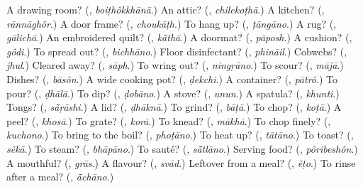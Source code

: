 \begin{tcolorbox}[breakable,colback=teal!4,colframe=teal!35!black,title={Before you move on}]
A drawing room? (\textbf{}, \emph{boiṭhôkkhānā}.) An attic? (\textbf{}, \emph{chilekoṭhā}.) A kitchen? (\textbf{}, \emph{rānnāghôr}.) A door frame? (\textbf{}, \emph{choukāṭh}.) To hang up? (\textbf{}, \emph{ṭāngāno}.) A rug? (\textbf{}, \emph{gālichā}.) An embroidered quilt? (\textbf{}, \emph{kā̃thā}.) A doormat? (\textbf{}, \emph{pāposh}.) A cushion? (\textbf{}, \emph{gôdi}.) To spread out? (\textbf{}, \emph{bichhāno}.) Floor disinfectant? (\textbf{}, \emph{phināil}.) Cobwebs? (\textbf{}, \emph{jhul}.) Cleared away? (\textbf{}, \emph{sāph}.) To wring out? (\textbf{}, \emph{ningṛāno}.) To scour? (\textbf{}, \emph{mājā}.) Dishes? (\textbf{}, \emph{bāsôn}.) A wide cooking pot? (\textbf{}, \emph{ḍekchi}.) A container? (\textbf{}, \emph{pātrô}.) To pour? (\textbf{}, \emph{ḍhālā}.) To dip? (\textbf{}, \emph{ḍobāno}.) A stove? (\textbf{}, \emph{unun}.) A spatula? (\textbf{}, \emph{khunti}.) Tongs? (\textbf{}, \emph{sā̃ṛāshi}.) A lid? (\textbf{}, \emph{ḍhāknā}.) To grind? (\textbf{}, \emph{bāṭā}.) To chop? (\textbf{}, \emph{koṭā}.) A peel? (\textbf{}, \emph{khosā}.) To grate? (\textbf{}, \emph{korā}.) To knead? (\textbf{}, \emph{mākhā}.) To chop finely? (\textbf{}, \emph{kuchono}.) To bring to the boil? (\textbf{}, \emph{phoṭāno}.) To heat up? (\textbf{}, \emph{tātāno}.) To toast? (\textbf{}, \emph{sẽkā}.) To steam? (\textbf{}, \emph{bhāpāno}.) To sauté? (\textbf{}, \emph{sā̃tlāno}.) Serving food? (\textbf{}, \emph{pôribeshôn}.) A mouthful? (\textbf{}, \emph{grās}.) A flavour? (\textbf{}, \emph{svād}.) Leftover from a meal? (\textbf{}, \emph{ẽṭo}.) To rinse after a meal? (\textbf{}, \emph{ā̃chāno}.)
\end{tcolorbox}

